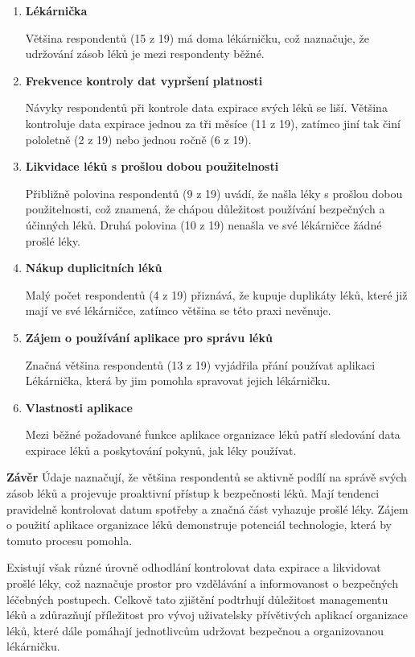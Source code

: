 \documentclass[a4paper, 11pt]{article}
\begin{document}
\begin{enumerate}
\item \textbf{Lékárnička}

Většina respondentů (15 z 19) má doma lékárničku, což naznačuje, že udržování zásob léků je mezi respondenty běžné.

\item \textbf {Frekvence kontroly dat vypršení platnosti}

Návyky respondentů při kontrole data expirace svých léků se liší. Většina kontroluje data expirace jednou za tři měsíce (11 z 19), zatímco jiní tak činí pololetně (2 z 19) nebo jednou ročně (6 z 19).

\item \textbf {Likvidace léků s prošlou dobou použitelnosti}

Přibližně polovina respondentů (9 z 19) uvádí, že našla léky s prošlou dobou použitelnosti, což znamená, že chápou důležitost používání bezpečných a účinných léků. Druhá polovina (10 z 19) nenašla ve své lékárničce žádné prošlé léky.

\item \textbf {Nákup duplicitních léků}

Malý počet respondentů (4 z 19) přiznává, že kupuje duplikáty léků, které již mají ve své lékárničce, zatímco většina se této praxi nevěnuje.

\item \textbf {Zájem o používání aplikace pro správu léků}

Značná většina respondentů (13 z 19) vyjádřila přání používat aplikaci Lékárnička, která by jim pomohla spravovat jejich lékárničku.

\item \textbf {Vlastnosti aplikace}

Mezi běžné požadované funkce aplikace organizace léků patří sledování data expirace léků a poskytování pokynů, jak léky používat.
\end{enumerate}

\textbf {Závěr}
Údaje naznačují, že většina respondentů se aktivně podílí na správě svých zásob léků a projevuje proaktivní přístup k bezpečnosti léků. Mají tendenci pravidelně kontrolovat datum spotřeby a značná část vyhazuje prošlé léky. Zájem o použití aplikace organizace léků demonstruje potenciál technologie, která by tomuto procesu pomohla.

Existují však různé úrovně odhodlání kontrolovat data expirace a likvidovat prošlé léky, což naznačuje prostor pro vzdělávání a informovanost o bezpečných léčebných postupech. Celkově tato zjištění podtrhují důležitost managementu léků a zdůrazňují příležitost pro vývoj uživatelsky přívětivých aplikací organizace léků, které dále pomáhají jednotlivcům udržovat bezpečnou a organizovanou lékárničku.
\end{document}
